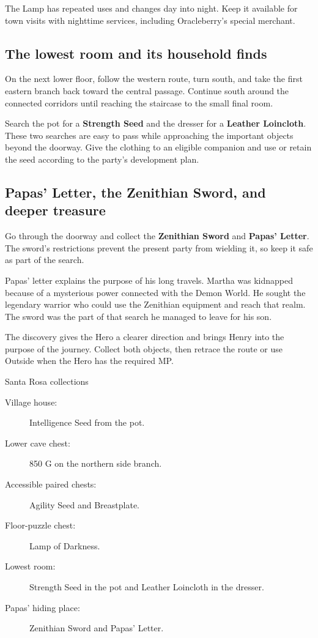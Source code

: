 The Lamp has repeated uses and changes day into night. Keep it available
for town visits with nighttime services, including Oracleberry's special
merchant.

\subsection*{The lowest room and its household finds}

On the next lower floor, follow the western route, turn south, and take
the first eastern branch back toward the central passage. Continue south
around the connected corridors until reaching the staircase to the
small final room.

Search the pot for a \textbf{Strength Seed} and the dresser for a
\textbf{Leather Loincloth}. These two searches are easy to pass while
approaching the important objects beyond the doorway. Give the clothing
to an eligible companion and use or retain the seed according to the
party's development plan.

\subsection{Papas' Letter, the Zenithian Sword, and deeper treasure}

Go through the doorway and collect the \textbf{Zenithian Sword} and
\textbf{Papas' Letter}. The sword's restrictions prevent the present
party from wielding it, so keep it safe as part of the search.


Papas' letter explains the purpose of his long travels. Martha was
kidnapped because of a mysterious power connected with the Demon World.
He sought the legendary warrior who could use the Zenithian equipment
and reach that realm. The sword was the part of that search he managed
to leave for his son.

The discovery gives the Hero a clearer direction and brings Henry into
the purpose of the journey. Collect both objects, then retrace the route
or use Outside when the Hero has the required MP.

\begin{routecheck}{Santa Rosa collections}
\begin{description}
  \item[Village house:] Intelligence Seed from the pot.
  \item[Lower cave chest:] 850 G on the northern side branch.
  \item[Accessible paired chests:] Agility Seed and Breastplate.
  \item[Floor-puzzle chest:] Lamp of Darkness.
  \item[Lowest room:] Strength Seed in the pot and Leather Loincloth
    in the dresser.
  \item[Papas' hiding place:] Zenithian Sword and Papas' Letter.
\end{description}
\end{routecheck}

